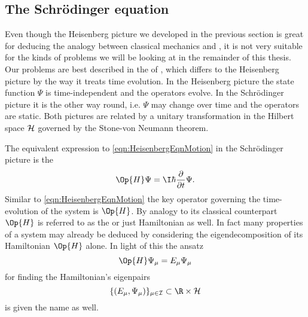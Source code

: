 \subsection{The Schrödinger equation}
Even though the Heisenberg picture we developed
in the previous section is great for deducing the analogy between
classical mechanics and \QM,
it is not very suitable for the kinds of problems we will be looking
at in the remainder of this thesis.
Our problems are best described in the  of \QM,
which differs to the Heisenberg picture by the way it treats time evolution.
In the Heisenberg picture the state function $\Psi$ is time-independent
and the operators evolve.
In the Schrödinger picture it is the other way round, i.e. $\Psi$ may change over time
and the operators are static.
Both pictures are related by a unitary transformation
in the Hilbert space $\mathcal{H}$
governed by the Stone-von Neumann theorem.

The equivalent expression to \eqref{eqn:HeisenbergEqnMotion}
in the Schrödinger picture is the %
~\cite{Shankar1994,Mueller2000}
\begin{equation}
	\Op{H} \Psi = \I \hbar \frac{\partial}{\partial t} \Psi.
	\label{eqn:TDSE}
\end{equation}
Similar to \eqref{eqn:HeisenbergEqnMotion} the key operator governing the
time-evolution of the system is $\Op{H}$.
By analogy to its classical counterpart $\Op{H}$ is referred to as the
 or just Hamiltonian as well.
In fact many properties of a system may already be deduced by considering the
eigendecomposition of its Hamiltonian $\Op{H}$ alone.
In light of this the ansatz
\begin{equation}
	\Op{H} \Psi_\mu = E_\mu \Psi_\mu
	\label{eqn:TISE}
\end{equation}
for finding the Hamiltonian's eigenpairs
\[ \{(E_\mu, \Psi_\mu)\}_{\mu \in \mathcal{I}} \subset \R \times \hilbert \]
is given the name  as well.

